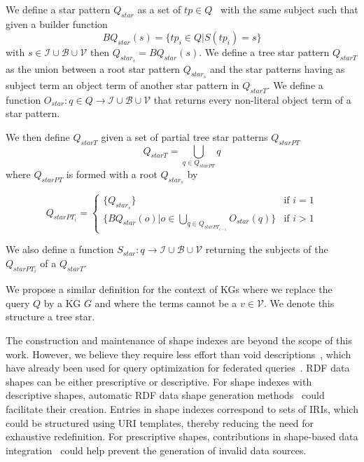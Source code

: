 \begin{definition}\label{def:starPattern}
   We define a star pattern $Q_{star}$ as a set of $tp \in Q$~\cite{Karim2020} with the same subject such that 
   given a builder function 
   \begin{equation}
       BQ_{star}(s) = \{tp_i \in Q| S(tp_i) = s\}
   \end{equation}
   with $s \in \mathcal{I} \cup \mathcal{B} \cup \mathcal{V}$ then $Q_{star_s} = BQ_{star}(s)$.
   We define a tree star pattern $Q_{starT}$ as the union between a root star pattern $Q_{star_s}$
   and the star patterns having as subject term an object term of another star pattern in $Q_{starT}$.
   We define a function 
   $O_{star}: q \in Q \rightarrow  \mathcal{I} \cup \mathcal{B} \cup \mathcal{V}$
   that returns every non-literal object term of a star pattern.

   We then define $Q_{starT}$ given a  set of partial tree star patterns $Q_{starPT}$
   \begin{equation}
       Q_{starT} = \bigcup_{q \in Q_{starPT}} q
   \end{equation}
   where $Q_{starPT}$ is formed with a root $Q_{star_s}$ by

   \begin{equation}
           Q_{starPT_i} =
       \begin{cases}
           \{Q_{star_s}\} & \text{if } i = 1 \\
           \{BQ_{star}(o)| o \in \bigcup\limits_{q \in Q_{starPT_{i-1}}} O_{star}(q)\} & \text{if } i>1
       \end{cases}
   \end{equation}

   We also define a function  
   $S_{star}: q \rightarrow  \mathcal{I} \cup \mathcal{B} \cup \mathcal{V}$
   returning the subjects of the $Q_{starPT_i}$ of a $Q_{starT}$.

   We propose a similar definition for the context of KGs where we replace the query $Q$ by a KG $G$ and where the terms 
   cannot be a $v \in \mathcal{V}$. 
   We denote this structure a tree star.
   
\end{definition}

The construction and maintenance of shape indexes are beyond the scope of this work.
However, we believe they require less effort than void descriptions~\cite{Boehm2011}, which have already been used for query optimization for federated queries~\cite{Montoya2017}.
RDF data shapes can be either prescriptive or descriptive.
For shape indexes with descriptive shapes, automatic RDF data shape generation methods~\cite{fernandez2023extracting} could facilitate their creation.
Entries in shape indexes correspond to sets of IRIs, which could be structured using URI templates, thereby reducing the need for exhaustive redefinition.
For prescriptive shapes, contributions in shape-based data integration~\cite{LabraGayo2023} could help prevent the generation of invalid data sources.


